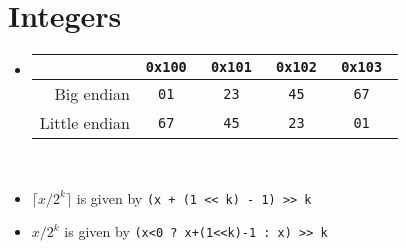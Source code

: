 \section{Integers}
\begin{itemize}[nosep]
    \item 
    \begin{tabular}{| r || c | c | c | c |}
        \hline
                      & \tt{0x100} & \tt{0x101} & \tt{0x102} & \tt{0x103} \\ \hline
        Big endian    & \tt{01}    & \tt{23}    & \tt{45}    & \tt{67}    \\ \hline
        Little endian & \tt{67}    & \tt{45}    & \tt{23}    & \tt{01}    \\ \hline
    \end{tabular} \\
    \item $\lceil x/2^k \rceil$ is given by \tt{(x + (1 << k) - 1) >> k}
    \item $x/2^k$ is given by \tt{(x<0 ? x+(1<<k)-1 : x) >> k}
\end{itemize}
